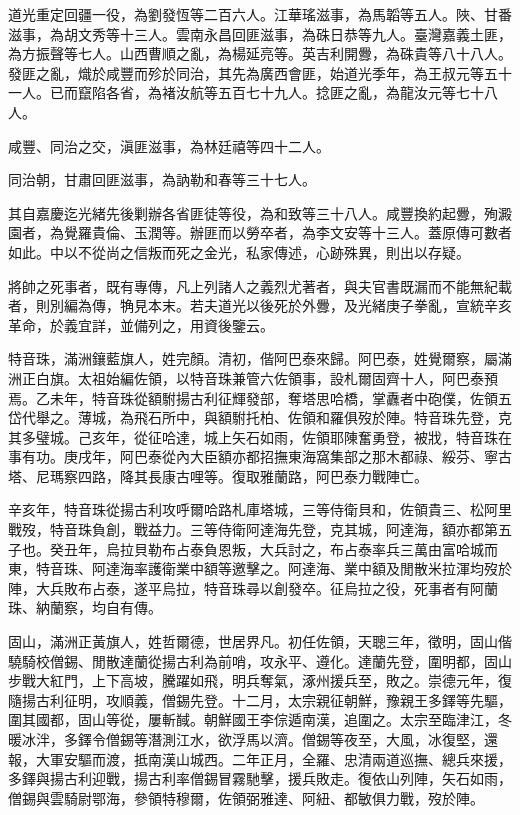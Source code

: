\begin{pinyinscope}
道光重定回疆一役，為劉發恆等二百六人。江華瑤滋事，為馬韜等五人。陜、甘番滋事，為胡文秀等十三人。雲南永昌回匪滋事，為硃日恭等九人。臺灣嘉義土匪，為方振聲等七人。山西曹順之亂，為楊延亮等。英吉利開釁，為硃貴等八十八人。發匪之亂，熾於咸豐而殄於同治，其先為廣西會匪，始道光季年，為王叔元等五十一人。已而竄陷各省，為褚汝航等五百七十九人。捻匪之亂，為龍汝元等七十八人。

咸豐、同治之交，滇匪滋事，為林廷禧等四十二人。

同治朝，甘肅回匪滋事，為訥勒和春等三十七人。

其自嘉慶迄光緒先後剿辦各省匪徒等役，為和致等三十八人。咸豐換約起釁，殉澱園者，為覺羅貴倫、玉潤等。辦匪而以勞卒者，為李文安等十三人。蓋原傳可數者如此。中以不從尚之信叛而死之金光，私家傳述，心跡殊異，則出以存疑。

將帥之死事者，既有專傳，凡上列諸人之義烈尤著者，與夫官書既漏而不能無紀載者，則別編為傳，觕見本末。若夫道光以後死於外釁，及光緒庚子拳亂，宣統辛亥革命，於義宜詳，並備列之，用資後鑒云。

特音珠，滿洲鑲藍旗人，姓完顏。清初，偕阿巴泰來歸。阿巴泰，姓覺爾察，屬滿洲正白旗。太祖始編佐領，以特音珠兼管六佐領事，設札爾固齊十人，阿巴泰預焉。乙未年，特音珠從額駙揚古利征輝發部，奪塔思哈橋，掌纛者中砲僕，佐領五岱代舉之。薄城，為飛石所中，與額駙托柏、佐領和羅俱歿於陣。特音珠先登，克其多璧城。己亥年，從征哈達，城上矢石如雨，佐領耶陳奮勇登，被戕，特音珠在事有功。庚戌年，阿巴泰從內大臣額亦都招撫東海窩集部之那木都祿、綏芬、寧古塔、尼瑪察四路，降其長康古哩等。復取雅蘭路，阿巴泰力戰陣亡。

辛亥年，特音珠從揚古利攻呼爾哈路札庫塔城，三等侍衛貝和，佐領貴三、松阿里戰歿，特音珠負創，戰益力。三等侍衛阿達海先登，克其城，阿達海，額亦都第五子也。癸丑年，烏拉貝勒布占泰負恩叛，大兵討之，布占泰率兵三萬由富哈城而東，特音珠、阿達海率護衛業中額等邀擊之。阿達海、業中額及閒散米拉渾均歿於陣，大兵敗布占泰，遂平烏拉，特音珠尋以創發卒。征烏拉之役，死事者有阿蘭珠、納蘭察，均自有傳。

固山，滿洲正黃旗人，姓哲爾德，世居界凡。初任佐領，天聰三年，徵明，固山偕驍騎校僧錫、閒散達蘭從揚古利為前哨，攻永平、遵化。達蘭先登，圍明都，固山步戰大紅門，上下高坡，騰躍如飛，明兵奪氣，涿州援兵至，敗之。崇德元年，復隨揚古利征明，攻順義，僧錫先登。十二月，太宗親征朝鮮，豫親王多鐸等先驅，圍其國都，固山等從，屢斬馘。朝鮮國王李倧遁南漢，追圍之。太宗至臨津江，冬暖冰泮，多鐸令僧錫等潛測江水，欲浮馬以濟。僧錫等夜至，大風，冰復堅，還報，大軍安驅而渡，抵南漢山城西。二年正月，全羅、忠清兩道巡撫、總兵來援，多鐸與揚古利迎戰，揚古利率僧錫冒霧馳擊，援兵敗走。復依山列陣，矢石如雨，僧錫與雲騎尉鄂海，參領特穆爾，佐領弼雅達、阿紐、都敏俱力戰，歿於陣。


\end{pinyinscope}
